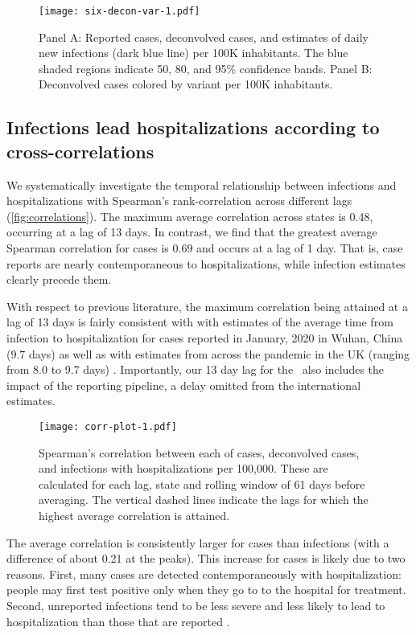 \begin{figure}[!tb]
\centering
    \texttt{[image: six-decon-var-1.pdf]}
    \caption{Panel A: Reported cases, deconvolved cases, and estimates of
    daily new infections (dark blue line) per 100K inhabitants. The blue shaded
    regions indicate 50, 80, and 95\% confidence bands.  
    Panel B: Deconvolved cases colored by variant per 100K inhabitants.}
    \label{fig:six-states}
\end{figure}


\subsection{Infections lead hospitalizations according to cross-correlations}
\label{sec:lagged-correlations}

We systematically investigate the temporal relationship between infections and
hospitalizations with Spearman's rank-correlation across different lags
(\autoref{fig:correlations}). The maximum average correlation across states is
0.48, occurring at a lag of 13 days. In contrast, we find that the greatest
average Spearman correlation for cases is 0.69 and occurs at a lag of 1 day.
That is, case reports are nearly contemporaneous to hospitalizations, while
infection estimates clearly precede them. 

With respect to previous literature, 
the maximum correlation being attained at a lag of 13 days is fairly consistent with
with estimates of the average time from infection to
hospitalization for cases reported in January, 2020 in Wuhan, China (9.7 days)
as well as with estimates from across the pandemic in the UK (ranging from 8.0
to 9.7 days) \citep{linton2020incubation, ward2021understanding}. 
Importantly, our 13 day lag for the
\US\ also includes the impact of the reporting pipeline, a delay omitted from
the international estimates. 

\begin{figure}[!tb]
\centering
\texttt{[image: corr-plot-1.pdf]} 
\caption{Spearman's correlation between each of cases, deconvolved cases, and
infections with hospitalizations per 100,000. These are calculated for each lag,
state and rolling window of 61 days before averaging. The vertical dashed lines
indicate the lags for which the highest average correlation is attained.}
\label{fig:correlations}
\end{figure}
    

The average correlation is consistently larger for cases than infections 
(with a difference of about 0.21 at the peaks). 
This increase for cases is likely due to two reasons. First, many cases are
detected contemporaneously with hospitalization: people may first test
positive only when they go to to the hospital for treatment. Second, unreported
infections tend to be less severe and less likely to lead to hospitalization
than those that are reported \citep{sallahi2021using}.




